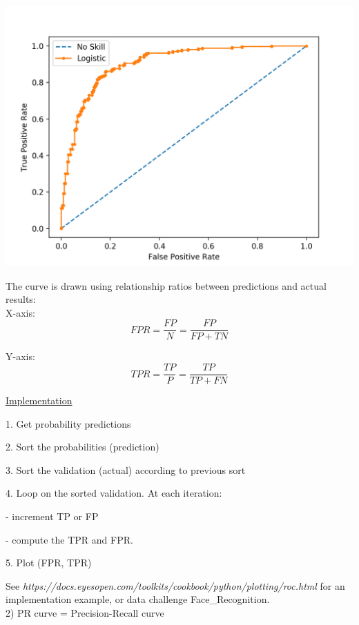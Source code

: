 \includegraphics[scale=0.5]{ROC.png}

\vspace{5mm}

The curve is drawn using relationship ratios between predictions and actual results: \\

X-axis: $$FPR = \frac{FP}{N} = \frac{FP}{FP + TN}$$

Y-axis: $$TPR = \frac{TP}{P} = \frac{TP}{TP + FN}$$

\vspace{5mm}

\underline{Implementation}

\vspace{5mm}

1. Get probability predictions

2. Sort the probabilities (prediction)

3. Sort the validation (actual) according to previous sort

4. Loop on the sorted validation. At each iteration:

- increment TP or FP

- compute the TPR and FPR.

5. Plot (FPR, TPR)

\vspace{5mm}

See \textit{https://docs.eyesopen.com/toolkits/cookbook/python/plotting/roc.html} for an implementation example, or data challenge Face\_Recognition. \\

2) PR curve = Precision-Recall curve \\

